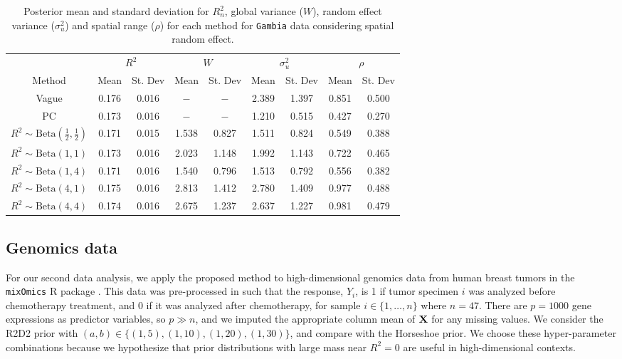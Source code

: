 \documentclass[12pt]{article}
\begin{document}
\begin{table}
    \centering
 \begin{tabular}{c|cc|cc|cc|cc}
    \multicolumn{1}{c|}{} &
    \multicolumn{2}{c|}{$R^2$}&
    \multicolumn{2}{c|}{$W$}&
    \multicolumn{2}{c|}{$\sigma^2_u$}&
    \multicolumn{2}{c}{$\rho$}\\
         Method & Mean & St. Dev & Mean & St. Dev & Mean & St. Dev  & Mean & St. Dev \\\hline
        Vague & 0.176 &0.016 &$-$ &$-$ &2.389 &1.397 &0.851 &0.500\\
        PC &0.173 &0.016 &$-$ & $-$ &1.210 &0.515 &0.427 &0.270 \\
        $R^2\sim\mbox{Beta}(\tfrac12,\tfrac12)$ & 0.171 &0.015 &1.538 &0.827 &1.511 &0.824 &0.549 &0.388\\
        $R^2\sim\mbox{Beta}(1,1)$&0.173 &0.016 &2.023 &1.148 &1.992 &1.143 &0.722 &0.465  \\
        $R^2\sim\mbox{Beta}(1,4)$ & 0.171 &0.016 &1.540 &0.796 &1.513 &0.792 &0.556 &0.382 \\
        $R^2\sim\mbox{Beta}(4,1)$ &0.175 &0.016 &2.813 &1.412 &2.780 &1.409 &0.977 &0.488\\
        $R^2\sim\mbox{Beta}(4,4)$ &0.174 &0.016 &2.675 &1.237 &2.637 &1.227 &0.981 &0.479
    \end{tabular}
    \caption{Posterior mean and standard deviation for $R_n^2$, global variance ($W$), random effect variance ($\sigma^2_u$) and spatial range ($\rho$) for each method for {\tt Gambia} data considering spatial random effect.}
    \label{tab:gamb_post_s}
\end{table}

\subsection{Genomics data}

For our second data analysis, we apply the proposed method to high-dimensional genomics data from human breast tumors \citep{perou2000molecular} in the \texttt{mixOmics} R package \citep{rohart2017mixomics}. This data was pre-processed in \cite{perez2003prediction} such that the response, $Y_i$, is 1 if tumor specimen $i$ was analyzed before chemotherapy treatment, and 0 if it was analyzed after chemotherapy, for sample $i\in\{1,\dots,n\}$ where $n=47$. There are $p=1000$ gene expressions as predictor variables, so $p\gg n$, and we imputed the appropriate column mean of $\mbox{\bf X}$ for any missing values. We consider the R2D2 prior with $(a,b)\in\{(1, 5),(1,10), (1,20), (1,30)\}$, and compare with the Horseshoe prior. We choose these hyper-parameter combinations because we hypothesize that prior distributions with large mass near $R^2=0$ are useful in high-dimensional contexts.
\end{document}
